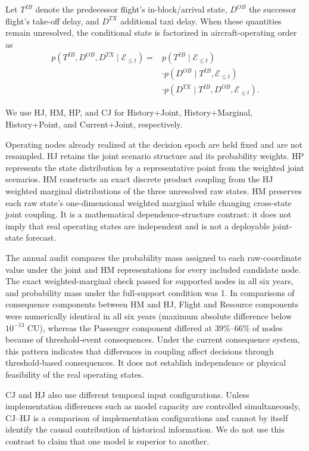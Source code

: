 \documentclass[10pt,a4paper]{article}
\numberwithin{equation}{section}
\begin{document}
Let $T^{IB}$ denote the predecessor flight's in-block/arrival state, $D^{OB}$ the successor flight's take-off delay, and $D^{TX}$ additional taxi delay. When these quantities remain unresolved, the conditional state is factorized in aircraft-operating order as
\begin{equation}
\begin{aligned}
p(T^{IB},D^{OB},D^{TX}\mid\mathcal E_{\leq t})
={}&p(T^{IB}\mid\mathcal E_{\leq t})\\
&\cdot p(D^{OB}\mid T^{IB},\mathcal E_{\leq t})\\
&\cdot p(D^{TX}\mid T^{IB},D^{OB},\mathcal E_{\leq t}).
\end{aligned}
\label{eq:factorization}
\end{equation}

We use HJ, HM, HP, and CJ for History+Joint, History+Marginal, History+Point, and Current+Joint, respectively.

Operating nodes already realized at the decision epoch are held fixed and are not resampled. HJ retains the joint scenario structure and its probability weights. HP represents the state distribution by a representative point from the weighted joint scenarios. HM constructs an exact discrete product coupling from the HJ weighted marginal distributions of the three unresolved raw states. HM preserves each raw state's one-dimensional weighted marginal while changing cross-state joint coupling. It is a mathematical dependence-structure contrast: it does not imply that real operating states are independent and is not a deployable joint-state forecast.

The annual audit compares the probability mass assigned to each raw-coordinate value under the joint and HM representations for every included candidate node. The exact weighted-marginal check passed for supported nodes in all six years, and probability mass under the full-support condition was 1. In comparisons of consequence components between HM and HJ, Flight and Resource components were numerically identical in all six years (maximum absolute difference below $10^{-13}$ CU), whereas the Passenger component differed at 39\%--66\% of nodes because of threshold-event consequences. Under the current consequence system, this pattern indicates that differences in coupling affect decisions through threshold-based consequences. It does not establish independence or physical feasibility of the real operating states.

CJ and HJ also use different temporal input configurations. Unless implementation differences such as model capacity are controlled simultaneously, CJ--HJ is a comparison of implementation configurations and cannot by itself identify the causal contribution of historical information. We do not use this contrast to claim that one model is superior to another.
\end{document}
